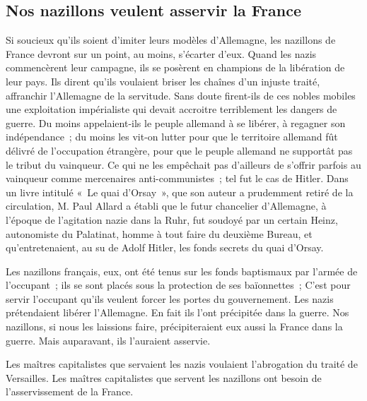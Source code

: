 \documentclass[french,twoside]{book} %
\begin{document}
\subsection[Nos nazillons veulent asservir la France]{Nos nazillons veulent asservir la France}
\noindent Si soucieux qu’ils soient d’imiter leurs modèles d’Allemagne, les nazillons de France devront sur un point, au moins, s’écarter d’eux. Quand les nazis commencèrent leur campagne, ils se posèrent en champions de la libération de leur pays. Ils dirent qu’ils voulaient briser les chaînes d’un injuste traité, affranchir l’Allemagne de la servitude. Sans doute firent-ils de ces nobles mobiles une exploitation impérialiste qui devait accroitre terriblement les dangers de guerre. Du moins appelaient-ils le peuple allemand à se libérer, à regagner son indépendance ; du moins les vit-on lutter pour que le territoire allemand fût délivré de l’occupation étrangère, pour que le peuple allemand ne supportât pas le tribut du vainqueur. Ce qui ne les empêchait pas d’ailleurs de s’offrir parfois au vainqueur comme mercenaires anti-communistes ; tel fut le cas de Hitler. Dans un livre intitulé « Le quai d’Orsay », que son auteur a prudemment retiré de la circulation, M. Paul Allard a établi que le futur chancelier d’Allemagne, à l’époque de l’agitation nazie dans la Ruhr, fut soudoyé par un certain Heinz, autonomiste du Palatinat, homme à tout faire du deuxième Bureau, et qu’entretenaient, au su de Adolf Hitler, les fonds secrets du quai d’Orsay.\par
Les nazillons français, eux, ont été tenus sur les fonds baptismaux par l’armée de l’occupant ; ils se sont placés sous la protection de ses baïonnettes ; C’est pour servir l’occupant qu’ils veulent forcer les portes du gouvernement. Les nazis prétendaient libérer l’Allemagne. En fait ils l’ont précipitée dans la guerre. Nos nazillons, si nous les laissions faire, précipiteraient eux aussi la France dans la guerre. Mais auparavant, ils l’auraient asservie.\par
Les maîtres capitalistes que servaient les nazis voulaient l’abrogation du traité de Versailles. Les maîtres capitalistes que servent les nazillons ont besoin de l’asservissement de la France.
\end{document}
